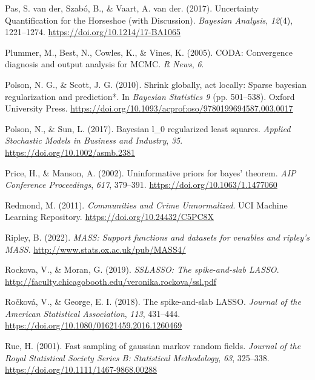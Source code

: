 \documentclass[
  11pt,
]{article}
\newlength{\cslhangindent}
\newlength{\cslentryspacingunit} %
\newenvironment{CSLReferences}[2] %
 {%
  \setlength{\parindent}{0pt}
  \ifodd #1
  \let\oldpar\par
  \def\par{\hangindent=\cslhangindent\oldpar}
  \fi
  \setlength{\parskip}{#2\cslentryspacingunit}
 }%
 {}
\begin{document}
\begin{CSLReferences}{1}{0}
\leavevmode{}%
Pas, S. van der, Szabó, B., \& Vaart, A. van der. (2017). {Uncertainty
Quantification for the Horseshoe (with Discussion)}. \emph{Bayesian
Analysis}, \emph{12}(4), 1221--1274.
\url{https://doi.org/10.1214/17-BA1065}

\leavevmode{}%
Plummer, M., Best, N., Cowles, K., \& Vines, K. (2005). CODA:
Convergence diagnosis and output analysis for MCMC. \emph{R News},
\emph{6}.

\leavevmode{}%
Polson, N. G., \& Scott, J. G. (2010). Shrink globally, act locally:
Sparse bayesian regularization and prediction*. In \emph{Bayesian
Statistics 9} (pp. 501--538). Oxford University Press.
\url{https://doi.org/10.1093/acprof:oso/9780199694587.003.0017}

\leavevmode{}%
Polson, N., \& Sun, L. (2017). Bayesian l\_0 regularized least squares.
\emph{Applied Stochastic Models in Business and Industry}, \emph{35}.
\url{https://doi.org/10.1002/asmb.2381}

\leavevmode{}%
Price, H., \& Manson, A. (2002). Uninformative priors for bayes'
theorem. \emph{AIP Conference Proceedings}, \emph{617}, 379--391.
\url{https://doi.org/10.1063/1.1477060}

\leavevmode{}%
Redmond, M. (2011). \emph{{Communities and Crime Unnormalized}}. UCI
Machine Learning Repository. \url{https://doi.org/10.24432/C5PC8X}

\leavevmode{}%
Ripley, B. (2022). \emph{MASS: Support functions and datasets for
venables and ripley's MASS}. \url{http://www.stats.ox.ac.uk/pub/MASS4/}

\leavevmode{}%
Rockova, V., \& Moran, G. (2019). \emph{SSLASSO: The spike-and-slab
LASSO}. \url{http://faculty.chicagobooth.edu/veronika.rockova/ssl.pdf}

\leavevmode{}%
Ročková, V., \& George, E. I. (2018). The spike-and-slab LASSO.
\emph{Journal of the American Statistical Association}, \emph{113},
431--444. \url{https://doi.org/10.1080/01621459.2016.1260469}

\leavevmode{}%
Rue, H. (2001). Fast sampling of gaussian markov random fields.
\emph{Journal of the Royal Statistical Society Series B: Statistical
Methodology}, \emph{63}, 325--338.
\url{https://doi.org/10.1111/1467-9868.00288}


\end{CSLReferences}
\end{document}

